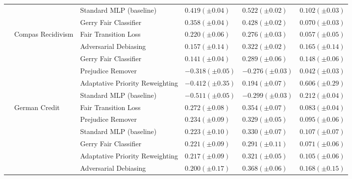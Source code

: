 \begin{tabular}{llllll}
 &  & Standard MLP (baseline) & $0.419 (\pm0.04)$ & $0.522 (\pm0.02)$ & $0.102 (\pm0.03)$ \\
 &  & Gerry Fair Classifier & $0.358 (\pm0.04)$ & $0.428 (\pm0.02)$ & $0.070 (\pm0.03)$ \\
\cline{2-6}
 & \multirow[t]{6}{*}{Compas Recidivism} & Fair Transition Loss & $0.220 (\pm0.06)$ & $0.276 (\pm0.03)$ & $0.057 (\pm0.05)$ \\
 &  & Adversarial Debiasing & $0.157 (\pm0.14)$ & $0.322 (\pm0.02)$ & $0.165 (\pm0.14)$ \\
 &  & Gerry Fair Classifier & $0.141 (\pm0.04)$ & $0.289 (\pm0.06)$ & $0.148 (\pm0.06)$ \\
 &  & Prejudice Remover & $-0.318 (\pm0.05)$ & $-0.276 (\pm0.03)$ & $0.042 (\pm0.03)$ \\
 &  & Adaptative Priority Reweighting & $-0.412 (\pm0.35)$ & $0.194 (\pm0.07)$ & $0.606 (\pm0.29)$ \\
 &  & Standard MLP (baseline) & $-0.511 (\pm0.05)$ & $-0.299 (\pm0.03)$ & $0.212 (\pm0.04)$ \\
\cline{2-6}
 & \multirow[t]{6}{*}{German Credit} & Fair Transition Loss & $0.272 (\pm0.08)$ & $0.354 (\pm0.07)$ & $0.083 (\pm0.04)$ \\
 &  & Prejudice Remover & $0.234 (\pm0.09)$ & $0.329 (\pm0.05)$ & $0.095 (\pm0.06)$ \\
 &  & Standard MLP (baseline) & $0.223 (\pm0.10)$ & $0.330 (\pm0.07)$ & $0.107 (\pm0.07)$ \\
 &  & Gerry Fair Classifier & $0.221 (\pm0.09)$ & $0.291 (\pm0.11)$ & $0.071 (\pm0.06)$ \\
 &  & Adaptative Priority Reweighting & $0.217 (\pm0.09)$ & $0.321 (\pm0.05)$ & $0.105 (\pm0.06)$ \\
 &  & Adversarial Debiasing & $0.200 (\pm0.17)$ & $0.368 (\pm0.06)$ & $0.168 (\pm0.15)$ \\
\cline{1-6} \cline{2-6}
\bottomrule
\end{tabular}
